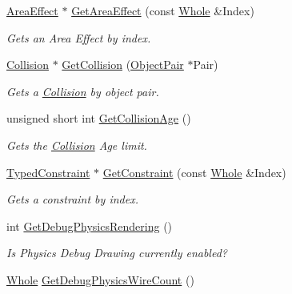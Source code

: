 \begin{DoxyCompactItemize}
\hyperlink{classMezzanine_1_1AreaEffect}{AreaEffect} $\ast$ \hyperlink{classMezzanine_1_1PhysicsManager_a648b109c3e2cf4436f492f5fce455878}{GetAreaEffect} (const \hyperlink{namespaceMezzanine_adcbb6ce6d1eb4379d109e51171e2e493}{Whole} \&Index)
\begin{DoxyCompactList}\small\item\em Gets an Area Effect by index. \item\end{DoxyCompactList}\item 
\hyperlink{classMezzanine_1_1Collision}{Collision} $\ast$ \hyperlink{classMezzanine_1_1PhysicsManager_a101a1b5f5b5c6950ec37cdbc15527413}{GetCollision} (\hyperlink{classMezzanine_1_1ObjectPair}{ObjectPair} $\ast$Pair)
\begin{DoxyCompactList}\small\item\em Gets a \hyperlink{classMezzanine_1_1Collision}{Collision} by object pair. \item\end{DoxyCompactList}\item 
unsigned short int \hyperlink{classMezzanine_1_1PhysicsManager_aa9e127b310b017f72ca70fc12255ba97}{GetCollisionAge} ()
\begin{DoxyCompactList}\small\item\em Gets the \hyperlink{classMezzanine_1_1Collision}{Collision} Age limit. \item\end{DoxyCompactList}\item 
\hyperlink{classMezzanine_1_1TypedConstraint}{TypedConstraint} $\ast$ \hyperlink{classMezzanine_1_1PhysicsManager_a2b96309bee2a20bb5c05ceda44baff0c}{GetConstraint} (const \hyperlink{namespaceMezzanine_adcbb6ce6d1eb4379d109e51171e2e493}{Whole} \&Index)
\begin{DoxyCompactList}\small\item\em Gets a constraint by index. \item\end{DoxyCompactList}\item 
int \hyperlink{classMezzanine_1_1PhysicsManager_a3dc5dbf00d4a6567561ea6fbf63da49d}{GetDebugPhysicsRendering} ()
\begin{DoxyCompactList}\small\item\em Is Physics Debug Drawing currently enabled? \item\end{DoxyCompactList}\item 
\hyperlink{namespaceMezzanine_adcbb6ce6d1eb4379d109e51171e2e493}{Whole} \hyperlink{classMezzanine_1_1PhysicsManager_a04e47cd46c50c979026a801caac1020c}{GetDebugPhysicsWireCount} ()

\end{DoxyCompactItemize}
